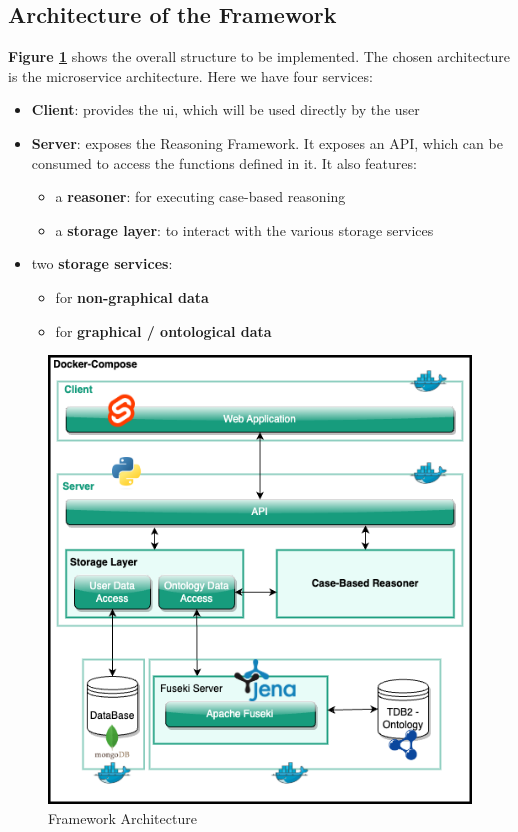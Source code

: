 \subsection{Architecture of the Framework \label{subsec:archi-frame}}
\textbf{Figure \ref{fig:frame-archi}} shows the overall structure to be implemented. The chosen architecture is the microservice architecture. Here we have four services:
\begin{itemize}
    \item \textbf{Client}: provides the \acrfull{ui}, which will be used directly by the user
    \item \textbf{Server}: exposes the Reasoning Framework. It exposes an API, which can be consumed to access the functions defined in it. It also features:
        \begin{itemize}
            \item a \textbf{reasoner}: for executing case-based reasoning
            \item a \textbf{storage layer}: to interact with the various storage services
        \end{itemize}
    
    \item two \textbf{storage services}: 
        \begin{itemize}
            \item for \textbf{non-graphical data}
            \item for \textbf{graphical / ontological data}
        \end{itemize}
\end{itemize}


\begin{figure}[h]
\centering
\includegraphics[scale=0.6]{images/SemanticAssistant-Detailled Architecture.drawio.png}
\caption{\label{fig:frame-archi}  Framework Architecture}
\end{figure}


